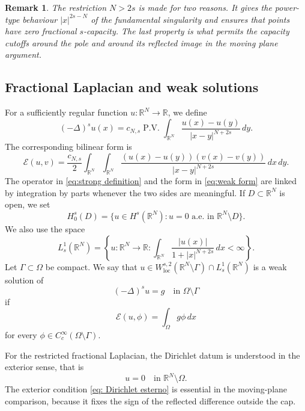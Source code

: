 \documentclass[11pt,a4paper]{article}
\newtheorem{remark}[theorem]{Remark}
\newcommand{\R}{\mathbb R}
\newcommand{\dd}{\,d}
\newcommand{\PV}{\operatorname{P.V.}}
\newcommand{\loc}{\mathrm{loc}}
\begin{document}
\begin{remark}
The restriction \(N>2s\) is made for two reasons. It gives the power-type behaviour \(|x|^{2s-N}\) of the fundamental singularity and ensures that points have zero fractional \(s\)-capacity. The last property is what permits the capacity cutoffs around the pole and around its reflected image in the moving plane argument.
\end{remark}
\subsection{Fractional Laplacian and weak solutions}

For a sufficiently regular function \(u:\R^N\to\R\), we define
\begin{equation}\label{eq:strong definition}
(-\Delta)^s u(x)=c_{N,s}\PV\int_{\R^N}\frac{u(x)-u(y)}{|x-y|^{N+2s}}\dd y.
\end{equation}
The corresponding bilinear form is
\begin{equation}\label{eq:weak form}
\mathcal E(u,v)=\frac{c_{N,s}}2\int_{\R^N}\int_{\R^N}
\frac{(u(x)-u(y))(v(x)-v(y))}{|x-y|^{N+2s}}\dd x\dd y.
\end{equation}
The operator in \eqref{eq:strong definition} and the form in \eqref{eq:weak form} are linked by integration by parts whenever the two sides are meaningful. If \(D\subset\R^N\) is open, we set
\[
H^s_0(D)=\{u\in H^s(\R^N): u=0\text{ a.e. in }\R^N\setminus D\}.
\]
We also use the space
\[
L^1_s(\R^N)=
\left\{
u:\R^N\to\R:
\int_{\R^N}\frac{|u(x)|}{1+|x|^{N+2s}}\dd x<\infty
\right\}.
\]
Let \(\Gamma\subset\Omega\) be compact. We say that \(u\in W^{s,2}_{\loc}(\R^N\setminus\Gamma)\cap L^1_s(\R^N)\) is a weak solution of
\[
(-\Delta)^s u=g\quad\text{in }\Omega\setminus\Gamma
\]
if
\begin{equation}\label{eq:weak definition}
\mathcal E(u,\phi)=\int_\Omega g\phi\dd x
\end{equation}
for every \(\phi\in C_c^\infty(\Omega\setminus\Gamma)\). 

For the restricted fractional Laplacian, the Dirichlet datum is understood in the exterior sense, that is
\begin{equation}\label{eq: Dirichlet esterno}
u=0\quad\text{in }\R^N\setminus\Omega.
\end{equation}
The exterior condition \eqref{eq: Dirichlet esterno} is essential in the moving-plane comparison, because it fixes the sign of the reflected difference outside the cap.
\end{document}

